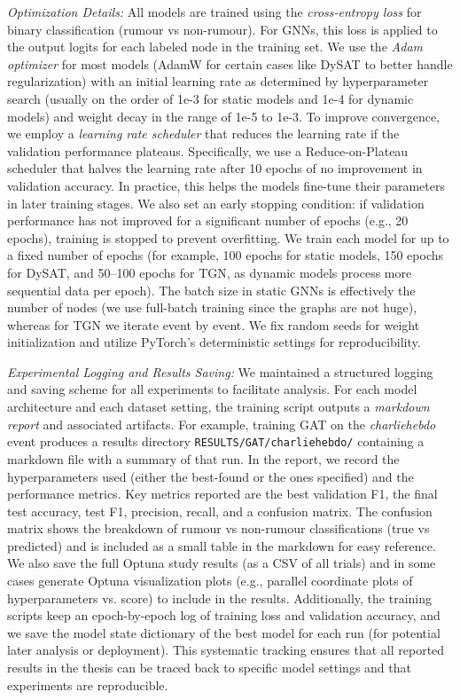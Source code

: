 \documentclass{cshonours}
\begin{document}
\emph{Optimization Details:} All models are trained using the \emph{cross-entropy loss} for binary classification (rumour vs non-rumour). For GNNs, this loss is applied to the output logits for each labeled node in the training set. We use the \emph{Adam optimizer} for most models (AdamW for certain cases like DySAT to better handle regularization) with an initial learning rate as determined by hyperparameter search (usually on the order of 1e-3 for static models and 1e-4 for dynamic models) and weight decay in the range of 1e-5 to 1e-3. To improve convergence, we employ a \emph{learning rate scheduler} that reduces the learning rate if the validation performance plateaus. Specifically, we use a Reduce-on-Plateau scheduler that halves the learning rate after 10 epochs of no improvement in validation accuracy. In practice, this helps the models fine-tune their parameters in later training stages. We also set an early stopping condition: if validation performance has not improved for a significant number of epochs (e.g., 20 epochs), training is stopped to prevent overfitting. We train each model for up to a fixed number of epochs (for example, 100 epochs for static models, 150 epochs for DySAT, and 50–100 epochs for TGN, as dynamic models process more sequential data per epoch). The batch size in static GNNs is effectively the number of nodes (we use full-batch training since the graphs are not huge), whereas for TGN we iterate event by event. We fix random seeds for weight initialization and utilize PyTorch's deterministic settings for reproducibility.

\emph{Experimental Logging and Results Saving:} We maintained a structured logging and saving scheme for all experiments to facilitate analysis. For each model architecture and each dataset setting, the training script outputs a \emph{markdown report} and associated artifacts. For example, training GAT on the \emph{charliehebdo} event produces a results directory \texttt{RESULTS/GAT/charliehebdo/} containing a markdown file with a summary of that run. In the report, we record the hyperparameters used (either the best-found or the ones specified) and the performance metrics. Key metrics reported are the best validation F1, the final test accuracy, test F1, precision, recall, and a confusion matrix. The confusion matrix shows the breakdown of rumour vs non-rumour classifications (true vs predicted) and is included as a small table in the markdown for easy reference. We also save the full Optuna study results (as a CSV of all trials) and in some cases generate Optuna visualization plots (e.g., parallel coordinate plots of hyperparameters vs. score) to include in the results. Additionally, the training scripts keep an epoch-by-epoch log of training loss and validation accuracy, and we save the model state dictionary of the best model for each run (for potential later analysis or deployment). This systematic tracking ensures that all reported results in the thesis can be traced back to specific model settings and that experiments are reproducible.
\end{document}
